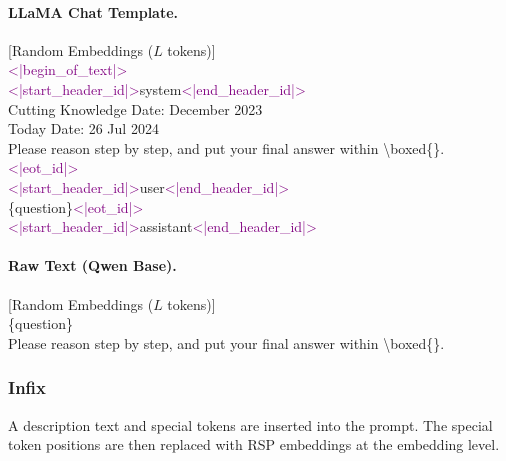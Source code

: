 \paragraph{LLaMA Chat Template.}
\begin{tcolorbox}[colback=gray!5, colframe=black!60, arc=3pt, boxrule=0.5pt, fontupper=\footnotesize\ttfamily, breakable]
\textcolor{blue!70!black}{[Random Embeddings ($L$ tokens)]}\\
\textcolor{purple}{<|begin\_of\_text|>}\\
\textcolor{purple}{<|start\_header\_id|>}system\textcolor{purple}{<|end\_header\_id|>}\\
Cutting Knowledge Date: December 2023\\
Today Date: 26 Jul 2024\\
Please reason step by step, and put your final answer within \textbackslash boxed\{\}.\textcolor{purple}{<|eot\_id|>}\\
\textcolor{purple}{<|start\_header\_id|>}user\textcolor{purple}{<|end\_header\_id|>}\\
\{question\}\textcolor{purple}{<|eot\_id|>}\\
\textcolor{purple}{<|start\_header\_id|>}assistant\textcolor{purple}{<|end\_header\_id|>}
\end{tcolorbox}

\paragraph{Raw Text (Qwen Base).}
\begin{tcolorbox}[colback=gray!5, colframe=black!60, arc=3pt, boxrule=0.5pt, fontupper=\footnotesize\ttfamily, breakable]
\textcolor{blue!70!black}{[Random Embeddings ($L$ tokens)]}\\
\{question\}\\
Please reason step by step, and put your final answer within \textbackslash boxed\{\}.
\end{tcolorbox}

\subsubsection{Infix}

A description text and special tokens are inserted into the prompt. The special token positions are then replaced with RSP embeddings at the embedding level.

